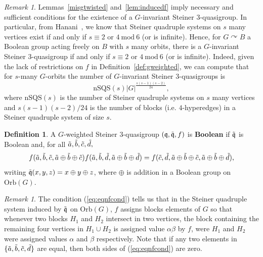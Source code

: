 \documentclass{article}
\theoremstyle{remark}
\newtheorem{remark}[theorem]{Remark}
\theoremstyle{definition}
\newtheorem{definition}[theorem]{Definition}
\def\acts{\curvearrowright}
\begin{document}
\begin{remark}\label{rem:exginvsteiner}
Lemmas~\ref{misgtwisted} and~\ref{lem:inducedf} imply necessary and sufficient conditions for the existence of a $G$-invariant Steiner $3$-quasigroup. In particular, from Hanani~\cite{hanani1960quadruple}, we know that Steiner quadruple systems on $s$ many vertices exist if and only if $s\equiv 2$ or $4 \ \mathrm{mod}\ 6$ (or is infinite). Hence, for $G\acts B$ a Boolean group acting freely on $B$ with $s$ many orbits, there is a $G$-invariant Steiner $3$-quasigroup if and only if
$s\equiv 2$ or $4 \ \mathrm{mod} \ 6$ (or is infinite). Indeed, given the lack of restrictions on $f$ in Definition~\ref{def:gweighted}, we can compute that for $s$-many $G$-orbits the number of $G$-invariant Steiner $3$-quasigroups is
\[\mathrm{nSQS}(s)|G|^{\frac{s(s-1)(s-2)}{24}},\]
where $\mathrm{nSQS}(s)$ is the number of Steiner quadruple systems on $s$ many vertices and $s(s-1)(s-2)/{24}$ is the number of blocks (i.e. $4$-hyperedges) in a Steiner quadruple system of size $s$.
\end{remark}

\begin{definition}\label{def:boolgweighted} A $G$-weighted Steiner $3$-quasigroup $(\mathfrak{q}, \Tilde{\mathfrak{q}}, f)$ is \textbf{Boolean} if $\Tilde{\mathfrak{q}}$ is Boolean and, for all $\Tilde{a}, \Tilde{b}, \Tilde{c}, \Tilde{d},$
\begin{equation}\label{eq:eqnfcond}
    f(\Tilde{a}, \Tilde{b}, \Tilde{c}, \Tilde{a}\oplus \Tilde{b}\oplus \Tilde{c}) f(\Tilde{a}, \Tilde{b}, \Tilde{d}, \Tilde{a}\oplus \Tilde{b}\oplus \Tilde{d})=f(\Tilde{c}, \Tilde{d}, \Tilde{a}\oplus \Tilde{b}\oplus \Tilde{c}, \Tilde{a}\oplus \Tilde{b}\oplus \Tilde{d}),
\end{equation}
  writing $\Tilde{\mathfrak{q}}(x, y, z)=x\oplus y \oplus z$, where $\oplus$ is addition in a Boolean group on $\mathrm{Orb}(G)$. 
\end{definition}


\begin{remark} The condition (\ref{eq:eqnfcond}) tells us that in the Steiner quadruple system induced by $\Tilde{\mathfrak{q}}$ on $\mathrm{Orb}(G)$, $f$ assigns blocks elements of $G$ so that whenever two blocks $H_1$ and $H_2$ intersect in two vertices, the block containing the remaining four vertices in $H_1\cup H_2$ is assigned value $\alpha\beta$ by $f$, were $H_1$ and $H_2$ were assigned values $\alpha$ and $\beta$ respectively. Note that if any two elements in $\{\Tilde{a}, \Tilde{b}, \Tilde{c}, \Tilde{d}\}$ are equal, then both sides of  (\ref{eq:eqnfcond}) are zero. 
\end{remark}
\end{document}
